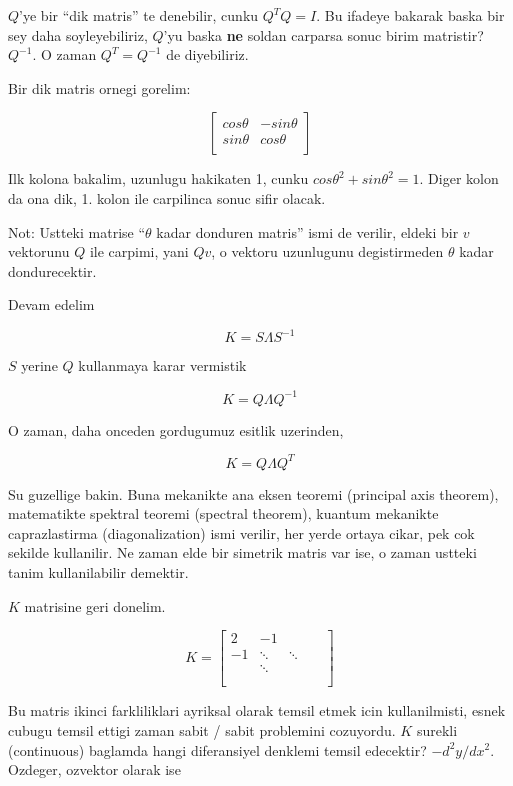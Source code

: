 \documentclass[12pt,fleqn]{article}\usepackage{../common}
\begin{document}
$Q$'ye bir ``dik matris'' te denebilir, cunku $Q^TQ = I$. Bu ifadeye
bakarak baska bir sey daha soyleyebiliriz, $Q$'yu baska \textbf{ne} soldan
carparsa sonuc birim matristir? $Q^{-1}$. O zaman $Q^T = Q^{-1}$ de
diyebiliriz.

Bir dik matris ornegi gorelim:

\[ 
\left[\begin{array}{cc}
cos \theta & -sin \theta \\
sin \theta & cos \theta \\
\end{array}\right]
 \]

Ilk kolona bakalim, uzunlugu hakikaten 1, cunku $cos \theta ^2 + sin \theta
^2 = 1$. 
Diger kolon da ona dik, 1. kolon ile carpilinca sonuc sifir olacak. 

Not: Ustteki matrise ``$\theta$ kadar donduren matris'' ismi de verilir,
eldeki bir $v$ vektorunu $Q$ ile carpimi, yani $Qv$, o vektoru uzunlugunu
degistirmeden $\theta$ kadar dondurecektir.

Devam edelim

\[ K = S \Lambda S^{-1} \]

$S$ yerine $Q$ kullanmaya karar vermistik

\[  K = Q \Lambda Q^{-1} \]

O zaman, daha onceden gordugumuz esitlik uzerinden, 

\[  K = Q \Lambda Q^{T} \]

Su guzellige bakin. Buna mekanikte ana eksen teoremi (principal axis
theorem), matematikte spektral teoremi (spectral theorem), kuantum
mekanikte caprazlastirma (diagonalization) ismi verilir, her yerde ortaya
cikar, pek cok sekilde kullanilir. Ne zaman elde bir simetrik matris var
ise, o zaman ustteki tanim kullanilabilir demektir.

$K$ matrisine geri donelim. 

\[ 
K =
\left[\begin{array}{rrrrr}
2 & -1 &&& \\
-1 & \ddots & \ddots && \\
& \ddots &&& \\
&&&& \\
&&&& 
\end{array}\right]
 \]

Bu matris ikinci farkliliklari ayriksal olarak temsil etmek icin
kullanilmisti, esnek cubugu temsil ettigi zaman sabit / sabit problemini
cozuyordu. $K$ surekli (continuous) baglamda hangi diferansiyel
denklemi temsil edecektir? $-d^2y/dx^2$.  Ozdeger, ozvektor olarak ise
\end{document}
